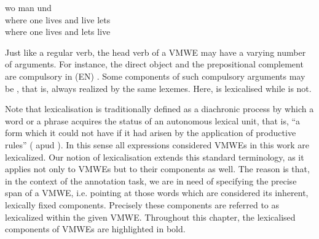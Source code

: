 \documentclass[output=paper,modfonts]{langscibook}
\begin{document}
\ea \label{de:leben-und-leben-lassen}
\settowidth {} 
\gll wo man  und  \\
where one lives and live lets \\ 
\glt where one lives and lets live 
\z


Just like a regular verb, the head verb of a VMWE may have a varying number of arguments. 
For instance, the direct object and the prepositional complement are compulsory in (EN) . Some components of such compulsory arguments may be , that is, always realized by the same lexemes. Here,  is lexicalised while  is not.

Note that lexicalisation is traditionally defined as a diachronic process by which a word or a phrase acquires the status of an autonomous lexical unit, that is, ``a form which it could not have if it had arisen by the application of productive rules'' (\citealt{bauer1983english} apud \citealt{Lipka-et-al:2004}). In this sense all expressions considered VMWEs in this work are lexicalized. 
Our notion of lexicalisation extends this standard terminology, as it applies not only to VMWEs but to their components as well. The reason is that, in the context of the annotation task, we are in need of specifying the precise span of a VMWE, i.e. pointing at those words which are considered its inherent, lexically fixed components. Precisely these components are referred to as lexicalized within the given VMWE. Throughout this chapter, the lexicalised components of VMWEs are highlighted in bold.
\end{document}
